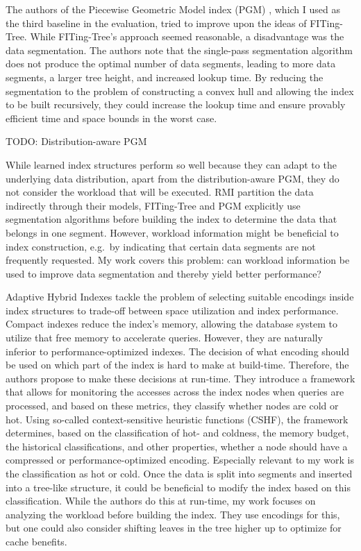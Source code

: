 The authors of the Piecewise Geometric Model index (PGM) \cite{Ferragina:2020pgm}, which I used as the third baseline in the evaluation, tried to improve upon the ideas of FITing-Tree. While FITing-Tree's approach seemed reasonable, a disadvantage was the data segmentation. The authors note that the single-pass segmentation algorithm does not produce the optimal number of data segments, leading to more data segments, a larger tree height, and increased lookup time. By reducing the segmentation to the problem of constructing a convex hull and allowing the index to be built recursively, they could increase the lookup time and ensure provably efficient time and space bounds in the worst case.

TODO: Distribution-aware PGM

While learned index structures perform so well because they can adapt to the underlying data distribution, apart from the distribution-aware PGM, they do not consider the workload that will be executed. RMI partition the data indirectly through their models, FITing-Tree and PGM explicitly use segmentation algorithms before building the index to determine the data that belongs in one segment. However, workload information might be beneficial to index construction, e.g.~by indicating that certain data segments are not frequently requested. My work covers this problem: can workload information be used to improve data segmentation and thereby yield better performance?

Adaptive Hybrid Indexes \cite{Anneser2022} tackle the problem of selecting suitable encodings inside index structures to trade-off between space utilization and index performance. Compact indexes reduce the index's memory, allowing the database system to utilize that free memory to accelerate queries. However, they are naturally inferior to performance-optimized indexes. The decision of what encoding should be used on which part of the index is hard to make at build-time. Therefore, the authors propose to make these decisions at run-time. They introduce a framework that allows for monitoring the accesses across the index nodes when queries are processed, and based on these metrics, they classify whether nodes are cold or hot. Using so-called context-sensitive heuristic functions (CSHF), the framework determines, based on the classification of hot- and coldness, the memory budget, the historical classifications, and other properties, whether a node should have a compressed or performance-optimized encoding. Especially relevant to my work is the classification as hot or cold. Once the data is split into segments and inserted into a tree-like structure, it could be beneficial to modify the index based on this classification. While the authors do this at run-time, my work focuses on analyzing the workload before building the index. They use encodings for this, but one could also consider shifting leaves in the tree higher up to optimize for cache benefits.

